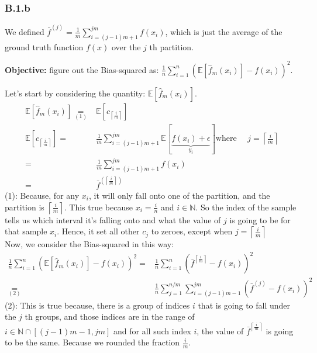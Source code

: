\documentclass[]{article}
\begin{document}
	\subsubsection*{B.1.b}
		\hspace{1.1em}
		We defined $\bar{f}^{(j)}=\frac{1}{m}\sum_{i = (j - 1)m + 1}^{jm}f\left(x_i\right)$, which is just the average of the ground truth function $f(x)$ over the $j$ th partition. 
		\par
		\textbf{Objective: } figure out the Bias-squared as: $\frac{1}{n}\sum_{i = 1}^{n}\left(\mathbb{E}\left[\hat{f}_m(x_i)\right] - f(x_i)\right)^2$. 
		\par
		Let's start by considering the quantity: $\mathbb{E}\left[\hat{f}_m(x_i)\right]$. 
		\begin{align*}\tag{B.1.b.1}\label{eqn:B.1.b.1}
			\mathbb{E}\left[\hat{f}_m(x_i)\right] \underset{(1)}{=}&
			\mathbb{E}\left[c_{\left\lceil\frac{i}{m}\right\rceil}\right]
			\\
			\mathbb{E}\left[c_{\left\lceil\frac{i}{m}\right\rceil}\right]
			=& 
			\frac{1}{m}\sum_{i=(j - 1)m + 1}^{jm}\mathbb{E}\left[\underbrace{f(x_i) + \epsilon}_{y_i}\right]
			\text{where } \quad  j = 
			\left\lceil\frac{i}{m}\right\rceil
			\\
			=& 
			\frac{1}{m}\sum_{i=(j - 1)m + 1}^{jm}f(x_i) 
			\\
			=&
			\bar{f}^{\left(
				\left\lceil\frac{i}{m}\right\rceil
			\right) }
		\end{align*}
		(1): Because, for any $x_i$, it will only fall onto one of the partition, and the partition is $\left\lceil \frac{i}{m}\right\rceil$. This true because $x_i = \frac{i}{n}$ and $i\in\mathbb{N}$. So the index of the sample tells us which interval it's falling onto and what the value of $j$ is going to be for that sample $x_i$. Hence, it set all other $c_j$ to zeroes, except when $j = \left\lceil\frac{i}{m}\right\rceil$
		\\[1em]
		Now, we consider the Bias-squared in this way: 
		\begin{align*}\tag{B.1.b.2}\label{eqn:B.1.b.2}
			\frac{1}{n}\sum_{i = 1}^{n}\left(\mathbb{E}\left[\hat{f}_m(x_i)\right] - f(x_i)\right)^2
			=&
			\frac{1}{n}\sum_{i = 1}^{n}\left(
				\bar{f}^{\left\lceil\frac{i}{m}\right\rceil}
				-
				f(x_i)
			\right)^2
			\\
			\underset{(2)}{=}&
			\frac{1}{n}\sum_{j = 1}^{n/m}\sum_{i = (j - 1)m - 1}^{jm}\left(
				\bar{f}^{(j)} - f(x_i)
			\right)^2
		\end{align*}
		(2): This is true because, there is a group of indices $i$ that is going to fall under the $j$ th groups, and those indices are in the range of $i \in \mathbb{N}\cap [(j - 1)m - 1, jm]$ and for all such index $i$, the value of $\bar{f}^{\left\lceil\frac{i}{m}\right\rceil}$ is going to be the same. Because we rounded the fraction $\frac{i}{m}$.
\end{document}

